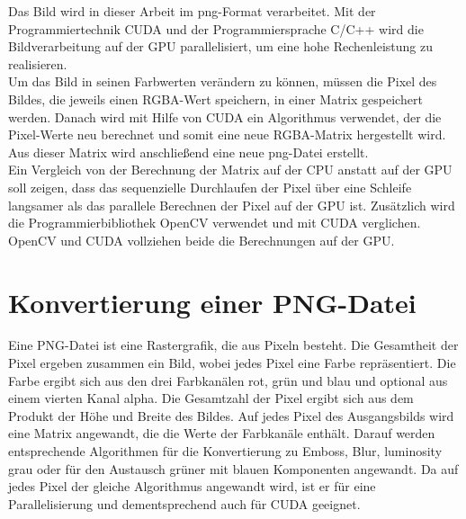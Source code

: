 \documentclass{llncs}
\begin{document}
Das Bild wird in dieser Arbeit im png-Format verarbeitet. Mit der Programmiertechnik CUDA und der Programmiersprache C/C++ wird die Bildverarbeitung auf der GPU parallelisiert, um eine hohe Rechenleistung zu realisieren.\\

Um das Bild in seinen Farbwerten verändern zu können, müssen die Pixel des Bildes, die jeweils einen RGBA-Wert speichern, in einer Matrix gespeichert werden. Danach wird mit Hilfe von CUDA ein Algorithmus verwendet, der die Pixel-Werte neu berechnet und somit eine neue RGBA-Matrix hergestellt wird. Aus dieser Matrix wird anschließend eine neue png-Datei erstellt.\\

Ein Vergleich von der Berechnung der Matrix auf der CPU anstatt auf der GPU soll zeigen, dass das sequenzielle Durchlaufen der Pixel über eine Schleife langsamer als das parallele Berechnen der Pixel auf der GPU ist. Zusätzlich wird die Programmierbibliothek OpenCV verwendet und mit CUDA verglichen. OpenCV und CUDA vollziehen beide die Berechnungen auf der GPU.\\

%
\section{Konvertierung einer PNG-Datei}
%

Eine PNG-Datei ist eine Rastergrafik, die aus Pixeln besteht. Die Gesamtheit der Pixel ergeben zusammen ein Bild, wobei jedes Pixel eine Farbe repräsentiert. Die Farbe ergibt sich aus den drei Farbkanälen rot, grün und blau und optional aus einem vierten Kanal alpha. Die Gesamtzahl der Pixel ergibt sich aus dem Produkt der Höhe und Breite des Bildes. Auf jedes Pixel des Ausgangsbilds wird eine Matrix angewandt, die die Werte der Farbkanäle enthält. Darauf werden entsprechende Algorithmen für die Konvertierung zu Emboss, Blur, luminosity grau oder für den Austausch grüner mit blauen Komponenten angewandt. Da auf jedes Pixel der gleiche Algorithmus angewandt wird, ist er für eine Parallelisierung und dementsprechend auch für CUDA geeignet.\\
\end{document}
